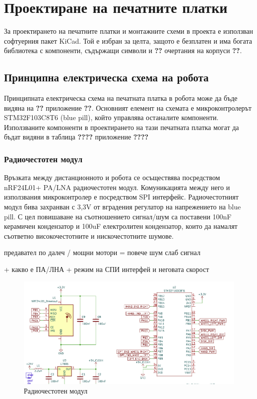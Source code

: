 \chapter{Проектиране на печатните платки}

За проектирането на печатните платки и монтажните схеми в проекта е използван софтуерния пакет KiCad. Той е избран за целта, защото е безплатен и има богата библиотека с компоненти, съдържащи символи и \textbf{??} очертания на корпуси \textbf{??}.


\section{Принципна електрическа схема на робота}

Принципната електрическа схема на печатната платка в робота може да бъде видяна на \textbf{??} приложение \textbf{??}. Основният елемент на схемата е микроконтролерът STM32F103C8T6 (blue pill), който управлява останалите компоненти. Използваните компоненти в проектирането на тази печатната платка могат да бъдат видяни в таблица \textbf{????} приложение \textbf{????}



\subsection{Радиочестотен модул}

Връзката между дистанционното и робота се осъществява посредством nRF24L01+ PA/LNA радиочестотен модул. Комуникацията между него и използвания микроконтролер е посредством SPI интерфейс. Радиочестотният модул бива захранван с 3,3V от вградения регулатор на напрежението на blue pill. С цел повишаване на съотношението сигнал/шум са поставени 100nF керамичен кондензатор и 100uF електролитен кондензатор, които да намалят съответно високочестотните и нискочестотните шумове.

предавател по далеч / мощни мотори = повече шум
слаб сигнал

+ какво е ПА/ЛНА 
+ режим на СПИ интерфей и неговата скорост
\begin{figure}[H]
    \centering
    \includegraphics[width=0.6\linewidth]{images/rf-module.png}
    
    \caption{Радиочестотен модул}
    \label{fig:rf-module} 
\end{figure}



